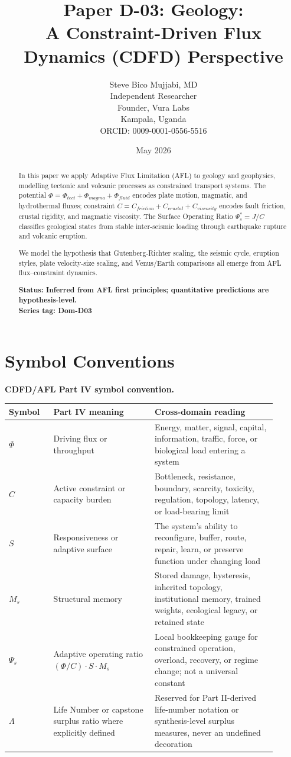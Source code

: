 \documentclass[11pt]{article}
\title{\textbf{Paper D-03: Geology:\\ A Constraint-Driven Flux Dynamics (CDFD) Perspective}}
\author{Steve Bico Mujjabi, MD\\
\small Independent Researcher\\
\small Founder, Vura Labs\\
\small Kampala, Uganda\\
\small ORCID: 0009-0001-0556-5516}
\date{May 2026}
\begin{document}
\maketitle
\newpage


\begin{abstract}
In this paper we apply Adaptive Flux Limitation (AFL) to geology and geophysics, modelling
tectonic and volcanic processes as constrained transport systems. The potential $\Phi = \Phi_{tect}
+ \Phi_{magma} + \Phi_{fluid}$ encodes plate motion, magmatic, and hydrothermal fluxes; constraint
$C = C_{friction} + C_{crustal} + C_{viscosity}$ encodes fault friction, crustal rigidity, and
magmatic viscosity. The Surface Operating Ratio $\Psi_s^* = J/C$ classifies geological states from
stable inter-seismic loading through earthquake rupture and volcanic eruption.

We model the hypothesis that Gutenberg-Richter scaling, the seismic cycle, eruption styles, plate
velocity-size scaling, and Venus/Earth comparisons all emerge from AFL flux--constraint dynamics.

\textbf{Status: Inferred from AFL first principles; quantitative predictions are hypothesis-level.}\\
\textbf{Series tag: Dom-D03}
\end{abstract}

\section*{Symbol Conventions}

\noindent\textbf{CDFD/AFL Part IV symbol convention.}
\begin{center}
{\small
\begin{tabular}{p{0.15\linewidth}p{0.34\linewidth}p{0.41\linewidth}}
\hline
Symbol & Part IV meaning & Cross-domain reading \\
\hline
$\Phi$ & Driving flux or throughput & Energy, matter, signal, capital, information, traffic, force, or biological load entering a system \\
$C$ & Active constraint or capacity burden & Bottleneck, resistance, boundary, scarcity, toxicity, regulation, topology, latency, or load-bearing limit \\
$S$ & Responsiveness or adaptive surface & The system's ability to reconfigure, buffer, route, repair, learn, or preserve function under changing load \\
$M_s$ & Structural memory & Stored damage, hysteresis, inherited topology, institutional memory, trained weights, ecological legacy, or retained state \\
$\Psi_s$ & Adaptive operating ratio $(\Phi/C)\cdot S\cdot M_s$ & Local bookkeeping gauge for constrained operation, overload, recovery, or regime change; not a universal constant \\
$\Lambda$ & Life Number or capstone surplus ratio where explicitly defined & Reserved for Part II-derived life-number notation or synthesis-level surplus measures, never an undefined decoration \\
\hline
\end{tabular}
}
\end{center}
\end{document}
